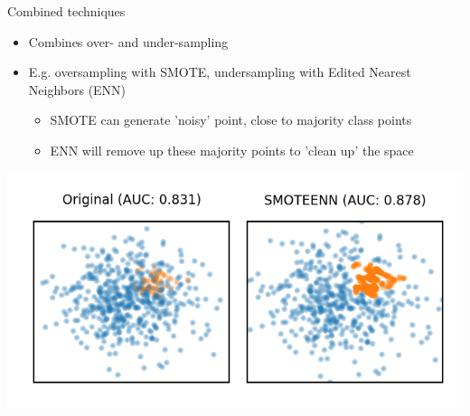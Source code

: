 \begin{frame}[allowframebreaks]{Combined techniques}
\begin{itemize}
    \item Combines over- and under-sampling
    \item E.g. oversampling with SMOTE, undersampling with Edited Nearest Neighbors (ENN)
    \begin{itemize}
        \item SMOTE can generate 'noisy' point, close to majority class points
        \item ENN will remove up these majority points to 'clean up' the space
    \end{itemize}
\end{itemize}

\begin{center}
    \includegraphics[width=0.85\linewidth]{images/pre-processing/smoteenn}
\end{center}
\end{frame}


